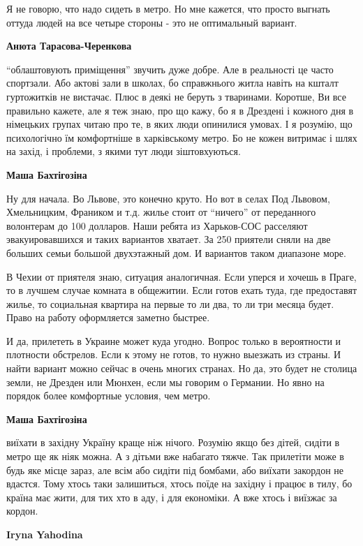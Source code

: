 \begin{itemize}
\begin{itemize}
Я не говорю, что надо сидеть в метро. Но мне кажется, что просто выгнать оттуда
людей на все четыре стороны - это не оптимальный вариант.

\textbf{Анюта Тарасова-Черенкова} 

\enquote{облаштовують приміщення} звучить дуже добре. Але в реальності це часто
спортзали. Або актові зали в школах, бо справжнього житла навіть на кшталт
гуртожитків не вистачає. Плюс в деякі не беруть з тваринами. Коротше, Ви все
правильно кажете, але я теж знаю, про що кажу, бо я в Дрездені і кожного дня в
німецьких групах читаю про те, в яких люди опинилися умовах. І я розумію, що
психологічно їм комфортніше в харківському метро. Бо не кожен витримає і шлях
на захід, і проблеми, з якими тут люди зіштовхуються.

\textbf{Маша Бахтігозіна} 

Ну для начала. Во Львове, это конечно круто. Но вот в селах Под Львовом,
Хмельницким, Фраником и т.д. жилье стоит от \enquote{ничего} от переданного волонтерам
до 100 долларов. Наши ребята из Харьков-СОС расселяют эвакуировавшихся и таких
вариантов хватает. За 250 приятели сняли на две больших семьи большой
двухэтажный дом. И вариантов таком диапазоне море.

В Чехии от приятеля знаю, ситуация аналогичная. Если уперся и хочешь в Праге,
то в лучшем случае комната в общежитии. Если готов ехать туда, где предоставят
жилье, то социальная квартира на первые то ли два, то ли три месяца будет.
Право на работу оформляется заметно быстрее.

И да, прилететь в Украине может куда угодно. Вопрос только в вероятности и
плотности обстрелов. Если к этому не готов, то нужно выезжать из страны. И
найти вариант можно сейчас в очень многих странах. Но да, это будет не столица
земли, не Дрезден или Мюнхен, если мы говорим о Германии. Но явно на порядок
более комфортные условия, чем метро.

\textbf{Маша Бахтігозіна} 

виїхати в західну Україну краще ніж нічого. Розумію якщо без дітей, сидіти в
метро ще як ніяк можна. А з дітьми вже набагато тяжче. Так прилетіти може в
будь яке місце зараз, але всім або сидіти під бомбами, або виїхати закордон не
вдастся. Тому хтось таки залишиться, хтось поїде на західну і працює в тилу, бо
країна має жити, для тих хто в аду, і для економіки. А вже хтось і виїзжає за
кордон.

\textbf{Iryna Yahodina} 


\end{itemize}
\end{itemize}

